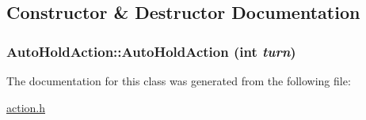 \subsection{Constructor \& Destructor Documentation}
\hypertarget{classAutoHoldAction_cff55ae9d07cf4e3b86569b78ebc07cc}{
\subsubsection[{AutoHoldAction}]{\setlength{\rightskip}{0pt plus 5cm}AutoHoldAction::AutoHoldAction (int {\em turn})}}
\label{classAutoHoldAction_cff55ae9d07cf4e3b86569b78ebc07cc}




The documentation for this class was generated from the following file:\begin{CompactItemize}
\item 
\hyperlink{action_8h}{action.h}\end{CompactItemize}
